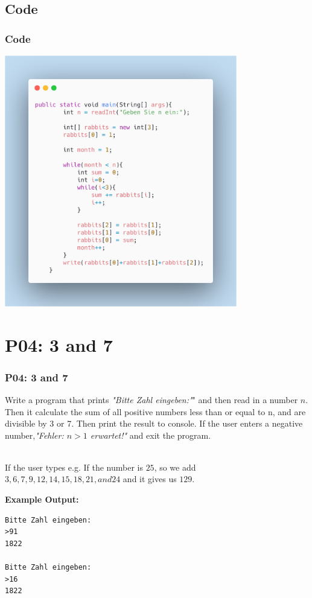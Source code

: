 \documentclass[handout, navsym]{tum-presentation}
\numberwithin{equation}{section}
\begin{document}
\subsection{Code}
\begin{frame}[fragile]
\frametitle{Code}

\vspace{-2cm}
\center \includegraphics[height=11cm]{p3-code.png}

\end{frame}

\section{P04: 3 and 7}
\begin{frame}[fragile]
\frametitle{P04: 3 and 7}
\vspace*{\fill} \large

Write a program that prints \textsl{ \color{blue}"Bitte Zahl eingeben:"}" and then read in a number $n$. Then it calculate the sum of all positive numbers less than or equal to n, and are divisible by 3 or 7. Then print the result to console. If the user enters a negative number,\textsl{\color{blue}"Fehler: $n >1$ erwartet!"} and exit the program.\par
~\\
If the user types e.g. If the number is $25$, so we add $3, 6, 7, 9, 12, 14, 15, 18, 21, and 24$ and it gives us $129$.\par
\bigskip
\textbf{\large Example Output:}
\begin{lstlisting}
Bitte Zahl eingeben:
>91
1822

Bitte Zahl eingeben:
>16
1822
\end{lstlisting}

\vspace*{\fill}
\end{frame}
\end{document}
